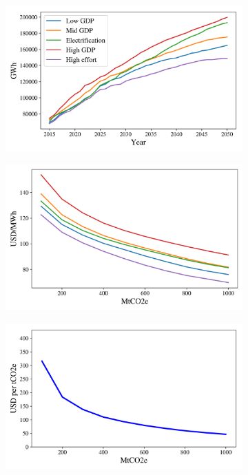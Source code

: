 \documentclass[11pt, letterpaper]{article}
\begin{document}
\begin{figure}[ht]
    \begin{subfigure}[t]{0.5\linewidth}
    \includegraphics[width=\textwidth]{draft_paper/Figures/demand_scenarios.png}
    \caption{}
  \label{fig:demand_scn}
  \end{subfigure}
  \begin{subfigure}[t]{0.5\linewidth}
    \includegraphics[width=\textwidth]{draft_paper/Figures/mean_prices_scenarios.png}
    \caption{ }
  \label{fig:mean_price}
  \end{subfigure}
  \begin{subfigure}[t]{0.5\linewidth}
    \includegraphics[width=\textwidth]{draft_paper/Figures/price_allowances.png}

\end{subfigure}
\end{figure}
\end{document}
